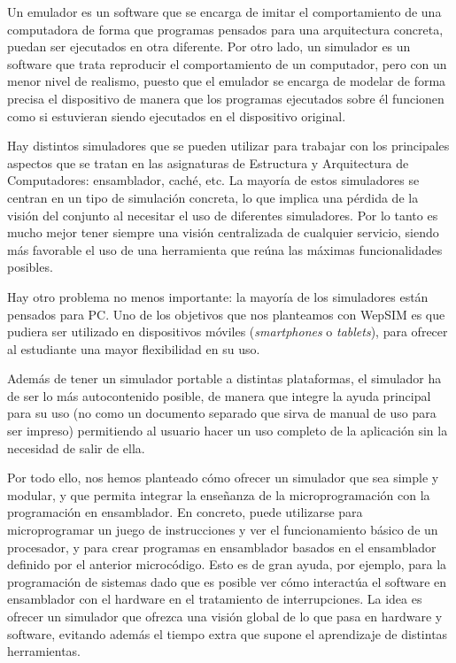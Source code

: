 Un emulador es un software que se encarga de imitar el comportamiento de una computadora de forma que programas pensados para una arquitectura concreta, puedan ser ejecutados en otra diferente. Por otro lado, un simulador es un software que trata reproducir el comportamiento de un computador, pero con un menor nivel de realismo, puesto que el emulador se encarga de modelar de forma precisa el dispositivo de manera que los programas ejecutados sobre él funcionen como si estuvieran siendo ejecutados en el dispositivo original.

Hay distintos simuladores que se pueden utilizar para trabajar con los principales aspectos que se tratan en las asignaturas de Estructura y Arquitectura de Computadores: ensamblador, caché, etc. La mayoría de estos simuladores se centran en un tipo de simulación concreta, lo que implica una pérdida de la visión del conjunto al necesitar el uso de diferentes simuladores. Por lo tanto es mucho mejor tener siempre una visión centralizada de cualquier servicio, siendo más favorable el uso de una herramienta que reúna las máximas funcionalidades posibles.

Hay otro problema no menos importante: la mayoría de los simuladores están pensados para PC. Uno de los objetivos que nos planteamos con WepSIM es que pudiera ser utilizado en dispositivos móviles (\emph{smartphones} o \emph{tablets}), para ofrecer al estudiante una mayor flexibilidad en su uso.

Además de tener un simulador portable a distintas plataformas, el simulador ha de ser lo más autocontenido posible, de manera que integre la ayuda principal para su uso (no como un documento separado que sirva de manual de uso para ser impreso) permitiendo al usuario hacer un uso completo de la aplicación sin la necesidad de salir de ella.

Por todo ello, nos hemos planteado cómo ofrecer un simulador que sea simple y modular, y que permita integrar la enseñanza de la microprogramación con la programación en ensamblador. En concreto, puede utilizarse para microprogramar un juego de instrucciones y ver el funcionamiento básico de un procesador, y para crear programas en ensamblador basados en el ensamblador definido por el anterior microcódigo. Esto es de gran ayuda, por ejemplo, para la programación de sistemas dado que es posible ver cómo interactúa el software en ensamblador con el hardware en el tratamiento de interrupciones. La idea es ofrecer un simulador que ofrezca una visión global de lo que pasa en hardware y software, evitando además el tiempo extra que supone el aprendizaje de distintas herramientas.


